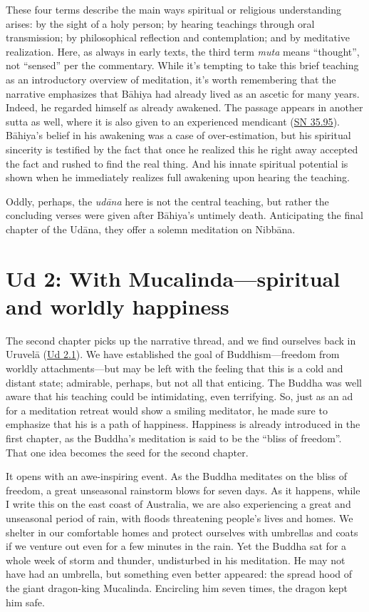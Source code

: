 \documentclass[12pt,openany]{book}%
\begin{document}
These four terms describe the main ways spiritual or religious understanding arises: by the sight of a holy person; by hearing teachings through oral transmission; by philosophical reflection and contemplation; and by meditative realization. Here, as always in early texts, the third term \textit{muta} means “thought”, not “sensed” per the commentary. While it’s tempting to take this brief teaching as an introductory overview of meditation, it’s worth remembering that the narrative emphasizes that \textsanskrit{Bāhiya} had already lived as an ascetic for many years. Indeed, he regarded himself as already awakened. The passage appears in another sutta as well, where it is also given to an experienced mendicant (\href{https://suttacentral.net/sn35.95/en/sujato}{SN 35.95}). \textsanskrit{Bāhiya}’s belief in his awakening was a case of over-estimation, but his spiritual sincerity is testified by the fact that once he realized this he right away accepted the fact and rushed to find the real thing. And his innate spiritual potential is shown when he immediately realizes full awakening upon hearing the teaching.

Oddly, perhaps, the \textit{\textsanskrit{udāna}} here is not the central teaching, but rather the concluding verses were given after \textsanskrit{Bāhiya}’s untimely death. Anticipating the final chapter of the \textsanskrit{Udāna}, they offer a solemn meditation on \textsanskrit{Nibbāna}.

\section*{Ud 2: With Mucalinda—spiritual and worldly happiness}

The second chapter picks up the narrative thread, and we find ourselves back in \textsanskrit{Uruvelā} (\href{https://suttacentral.net/ud2.1/en/sujato}{Ud 2.1}). We have established the goal of Buddhism—freedom from worldly attachments—but may be left with the feeling that this is a cold and distant state; admirable, perhaps, but not all that enticing. The Buddha was well aware that his teaching could be intimidating, even terrifying. So, just as an ad for a meditation retreat would show a smiling meditator, he made sure to emphasize that his is a path of happiness. Happiness is already introduced in the first chapter, as the Buddha’s meditation is said to be the “bliss of freedom”.  That one idea becomes the seed for the second chapter.

It opens with an awe-inspiring event. As the Buddha meditates on the bliss of freedom, a great unseasonal rainstorm blows for seven days. As it happens, while I write this on the east coast of Australia, we are also experiencing a great and unseasonal period of rain, with floods threatening people's lives and homes. We shelter in our comfortable homes and protect ourselves with umbrellas and coats if we venture out even for a few minutes in the rain. Yet the Buddha sat for a whole week of storm and thunder, undisturbed in his meditation. He may not have had an umbrella, but something even better appeared: the spread hood of the giant dragon-king Mucalinda. Encircling him seven times, the dragon kept him safe.
\end{document}
